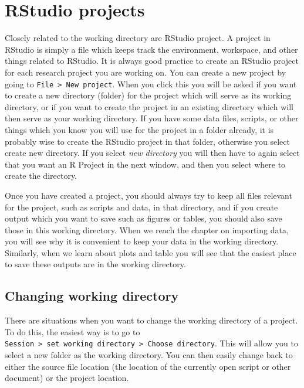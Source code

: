 \documentclass[
]{book}
\begin{document}
\hypertarget{rstudio-projects}{%
\section{RStudio projects}\label{rstudio-projects}}

Closely related to the working directory are RStudio project. A project in RStudio is simply a file which keeps track the environment, workspace, and other things related to RStudio. It is always good practice to create an RStudio project for each research project you are working on. You can create a new project by going to \texttt{File\ \textgreater{}\ New\ project}. When you click this you will be asked if you want to create a new directory (folder) for the project which will serve as its working directory, or if you want to create the project in an existing directory which will then serve as your working directory. If you have some data files, scripts, or other things which you know you will use for the project in a folder already, it is probably wise to create the RStudio project in that folder, otherwise you select create new directory. If you select \emph{new directory} you will then have to again select that you want an R Project in the next window, and then you select where to create the directory.

Once you have created a project, you should always try to keep all files relevant for the project, such as scripts and data, in that directory, and if you create output which you want to save such as figures or tables, you should also save those in this working directory. When we reach the chapter on importing data, you will see why it is convenient to keep your data in the working directory. Similarly, when we learn about plots and table you will see that the easiest place to save these outputs are in the working directory.

\hypertarget{changing-working-directory}{%
\subsection{Changing working directory}\label{changing-working-directory}}

There are situations when you want to change the working directory of a project. To do this, the easiest way is to go to \texttt{Session\ \textgreater{}\ set\ working\ directory\ \textgreater{}\ Choose\ directory}. This will allow you to select a new folder as the working directory. You can then easily change back to either the source file location (the location of the currently open script or other document) or the project location.
\end{document}
